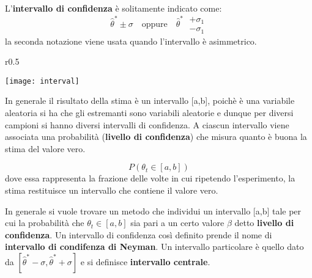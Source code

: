 \noindent L'\textbf{intervallo di confidenza} \`{e} solitamente indicato come:
\begin{equation}
	\hat{\theta}^* \pm \sigma \quad \text{oppure} \quad \hat{\theta}^* \; \begin{matrix}
		+\sigma_1 \\ - \sigma_1
	\end{matrix}
\end{equation}
la seconda notazione viene usata quando l'intervallo \`{e} asimmetrico. \newline
\begin{wrapfigure}{r}{0.5 \textwidth}

\vspace{-10pt}
\centering
\texttt{[image: interval]}	

\end{wrapfigure}
In generale il risultato della stima \`{e} un intervallo [a,b], poich\`{e} \`{e} una variabile aleatoria si ha che gli estremanti sono variabili aleatorie e dunque per diversi campioni si hanno diversi intervalli di confidenza. A ciascun intervallo viene associata una probabilit\`{a} (\textbf{livello di confidenza}) che misura quanto \`{e} buona la stima del valore vero.

\begin{equation*}
	P(\theta_t \in [a,b])
\end{equation*}
dove essa rappresenta la frazione delle volte in cui ripetendo l'esperimento, la stima restituisce un intervallo che contiene il valore vero.\newline

In generale si vuole trovare un metodo che individui un intervallo [a,b] tale per cui la probabilit\`{a} che $\theta_t \in [a,b]$ sia pari a un certo valore $\beta$ detto \textbf{livello di confidenza}. Un intervallo di confidenza cos\`{i} definito prende il nome di \textbf{intervallo di condifenza di Neyman}. Un intervallo particolare \`{e} quello dato da $[\hat{\theta}^* - \sigma, \hat{\theta}^* + \sigma]$ e si definisce \textbf{intervallo centrale}.

